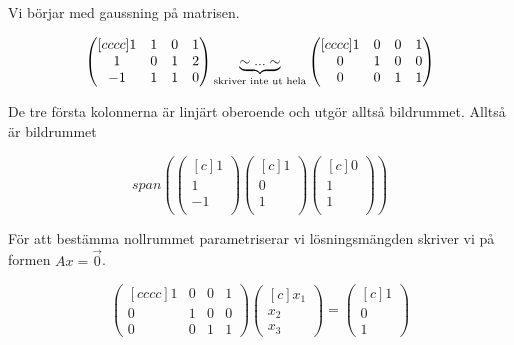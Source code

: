 \documentclass[../../main.tex]{subfiles}
\begin{document}
\begin{solution}{17} %

    Vi börjar med gaussning på matrisen.

    $$
        \begin{pmatrix}[cccc]
            1  & 1 & 0 & 1 \\
            1  & 0 & 1 & 2 \\
            -1 & 1 & 1 & 0
        \end{pmatrix}
        \underbrace{\sim ... \sim}_{\text{skriver inte ut hela}}
        \begin{pmatrix}[cccc]
            1 & 0 & 0 & 1 \\
            0 & 1 & 0 & 0 \\
            0 & 0 & 1 & 1
        \end{pmatrix}
    $$


    De tre första kolonnerna är linjärt oberoende och utgör alltså bildrummet. Alltså är bildrummet

    $$
        span({\begin{pmatrix}[c]
                    1  \\
                    1  \\
                    -1 \\
                \end{pmatrix}
                \begin{pmatrix}[c]
                    1 \\
                    0 \\
                    1 \\
                \end{pmatrix}
                \begin{pmatrix}[c]
                    0 \\
                    1 \\
                    1 \\
                \end{pmatrix}
            })
    $$

    För att bestämma nollrummet parametriserar vi lösningsmängden skriver vi på formen $Ax = \vec{0}$.

    $$
        \begin{pmatrix}[cccc]
            1 & 0 & 0 & 1 \\
            0 & 1 & 0 & 0 \\
            0 & 0 & 1 & 1
        \end{pmatrix}
        \begin{pmatrix}[c]
            x_1 \\
            x_2 \\
            x_3
        \end{pmatrix}
        =
        \begin{pmatrix}[c]
            1 \\
            0 \\
            1
        \end{pmatrix}
    $$


\end{solution}
\end{document}
